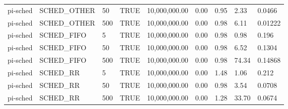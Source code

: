\documentclass{article}
\begin{document}
\begin{table}[H]
{\begin{tabular}{lllllllll}
pi-sched & SCHED\_OTHER & 50                  & TRUE          & 10,000,000.00 & 0.00        & 0.95      & 2.33      & 0.0466                \\
pi-sched & SCHED\_OTHER & 500                 & TRUE          & 10,000,000.00 & 0.00        & 0.98      & 6.11      & 0.01222               \\
pi-sched & SCHED\_FIFO  & 5                   & TRUE          & 10,000,000.00 & 0.00        & 0.98      & 0.98      & 0.196                 \\
pi-sched & SCHED\_FIFO  & 50                  & TRUE          & 10,000,000.00 & 0.00        & 0.98      & 6.52      & 0.1304                \\
pi-sched & SCHED\_FIFO  & 500                 & TRUE          & 10,000,000.00 & 0.00        & 0.98      & 74.34     & 0.14868               \\
pi-sched & SCHED\_RR    & 5                   & TRUE          & 10,000,000.00 & 0.00        & 1.48      & 1.06      & 0.212                 \\
pi-sched & SCHED\_RR    & 50                  & TRUE          & 10,000,000.00 & 0.00        & 0.98      & 3.54      & 0.0708                \\
pi-sched & SCHED\_RR    & 500                 & TRUE          & 10,000,000.00 & 0.00        & 1.28      & 33.70     & 0.0674
\end{tabular}
}
\end{table}
\end{document}
